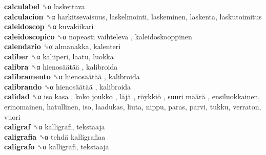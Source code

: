 \textbf{calculabel} ␝α  laskettava  \\
\textbf{calculacion} ␝α  harkitsevaisuus, laskelmointi, laskeminen, laskenta, laskutoimitus  \\
\textbf{caleidoscop} ␝α  kuvakiikari  \\
\textbf{caleidoscopico} ␝α   nopeasti vaihteleva , kaleidoskooppinen  \\
\textbf{calendario} ␝α  almanakka, kalenteri  \\
\textbf{caliber} ␝α  kaliiperi, laatu, luokka  \\
\textbf{calibra} ␝α   hienosäätää , kalibroida  \\
\textbf{calibramento} ␝α   hienosäätää , kalibroida  \\
\textbf{calibrando} ␝α   hienosäätää , kalibroida  \\
\textbf{calidad} ␝α   iso kasa ,  koko joukko ,  läjä ,  röykkiö ,  suuri määrä , ensiluokkainen, erinomainen, hatullinen, iso, laadukas, liuta, nippu, paras, parvi, tukku, verraton, vuori  \\
\textbf{caligraf} ␝α  kalligrafi, tekstaaja  \\
\textbf{caligrafia} ␝α   tehdä kalligrafiaa   \\
\textbf{caligrafo} ␝α  kalligrafi, tekstaaja  \\
